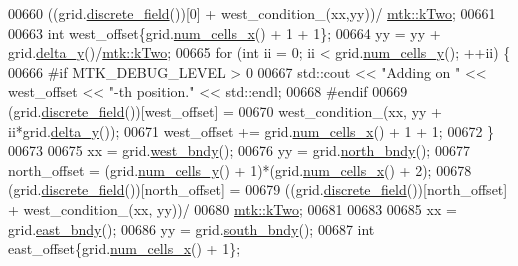 \begin{DoxyCode}
00660       ((grid.\hyperlink{classmtk_1_1UniStgGrid2D_a3e72d59843a3f9c5e47da07e5850dfe0}{discrete\_field}())[0] + west\_condition\_(xx,yy))/
      \hyperlink{group__c01-roots_gaf39c2d851a2db744f4feb1c5ab3ec2cf}{mtk::kTwo};
00661 
00663     \textcolor{keywordtype}{int} west\_offset\{grid.\hyperlink{classmtk_1_1UniStgGrid2D_a2d182866a398aba8e4829590e85bf939}{num\_cells\_x}() + 1 + 1\};
00664     yy = yy + grid.\hyperlink{classmtk_1_1UniStgGrid2D_a65a78cfc80ffdbeb282ed57af4dc5cb4}{delta\_y}()/\hyperlink{group__c01-roots_gaf39c2d851a2db744f4feb1c5ab3ec2cf}{mtk::kTwo};
00665     \textcolor{keywordflow}{for} (\textcolor{keywordtype}{int} ii = 0; ii < grid.\hyperlink{classmtk_1_1UniStgGrid2D_aed05a801cc9a76dba0ff203cea58a61a}{num\_cells\_y}(); ++ii) \{
00666 \textcolor{preprocessor}{      #if MTK\_DEBUG\_LEVEL > 0}
00667       std::cout << \textcolor{stringliteral}{"Adding on "} << west\_offset << \textcolor{stringliteral}{"-th position."} << std::endl;
00668 \textcolor{preprocessor}{      #endif}
00669       (grid.\hyperlink{classmtk_1_1UniStgGrid2D_a3e72d59843a3f9c5e47da07e5850dfe0}{discrete\_field}())[west\_offset] =
00670         west\_condition\_(xx, yy + ii*grid.\hyperlink{classmtk_1_1UniStgGrid2D_a65a78cfc80ffdbeb282ed57af4dc5cb4}{delta\_y}());
00671       west\_offset += grid.\hyperlink{classmtk_1_1UniStgGrid2D_a2d182866a398aba8e4829590e85bf939}{num\_cells\_x}() + 1 + 1;
00672     \}
00673 
00675     xx = grid.\hyperlink{classmtk_1_1UniStgGrid2D_af2b1712387ded85edaf2b64617d3fc13}{west\_bndy}();
00676     yy = grid.\hyperlink{classmtk_1_1UniStgGrid2D_afe1ead253cdeb5503e0489eba8fd84e2}{north\_bndy}();
00677     north\_offset = (grid.\hyperlink{classmtk_1_1UniStgGrid2D_aed05a801cc9a76dba0ff203cea58a61a}{num\_cells\_y}() + 1)*(grid.\hyperlink{classmtk_1_1UniStgGrid2D_a2d182866a398aba8e4829590e85bf939}{num\_cells\_x}() + 2);
00678     (grid.\hyperlink{classmtk_1_1UniStgGrid2D_a3e72d59843a3f9c5e47da07e5850dfe0}{discrete\_field}())[north\_offset] =
00679       ((grid.\hyperlink{classmtk_1_1UniStgGrid2D_a3e72d59843a3f9c5e47da07e5850dfe0}{discrete\_field}())[north\_offset] + west\_condition\_(xx, yy))/
00680         \hyperlink{group__c01-roots_gaf39c2d851a2db744f4feb1c5ab3ec2cf}{mtk::kTwo};
00681 
00683 
00685     xx = grid.\hyperlink{classmtk_1_1UniStgGrid2D_a03f689eb29a6369b82ce1207c655d5ff}{east\_bndy}();
00686     yy = grid.\hyperlink{classmtk_1_1UniStgGrid2D_a1442eaf219f099d0ebf46a170fdebf92}{south\_bndy}();
00687     \textcolor{keywordtype}{int} east\_offset\{grid.\hyperlink{classmtk_1_1UniStgGrid2D_a2d182866a398aba8e4829590e85bf939}{num\_cells\_x}() + 1\};

\end{DoxyCode}
